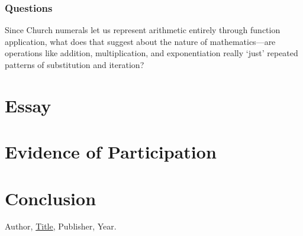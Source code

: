 \documentclass{article}
\theoremstyle{theorem}
\theoremstyle{definition}
\theoremstyle{remark}
\begin{document}
\subsubsection{Questions}

Since Church numerals let us represent arithmetic entirely through function application, what does that suggest about the nature of mathematics—are operations like addition, multiplication, and exponentiation really ‘just’ repeated patterns of substitution and iteration?

\section{Essay}

\section{Evidence of Participation}

\section{Conclusion}\label{conclusion}

\begin{thebibliography}{99}
 Author, \href{https://en.wikipedia.org/wiki/LaTeX}{Title}, Publisher, Year.
\end{thebibliography}
\end{document}
